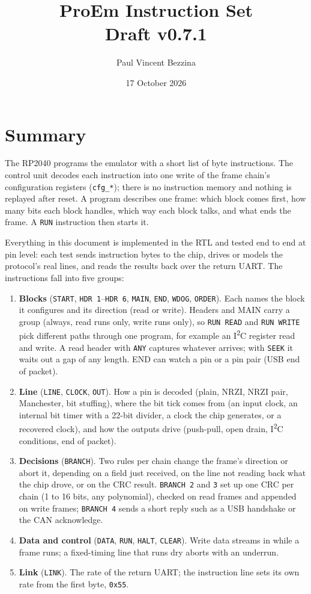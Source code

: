 \documentclass[11pt,a4paper]{article}
\title{ProEm Instruction Set\\\large Draft v0.7.1}
\author{Paul Vincent Bezzina}
\date{17 October 2026}
\newcommand{\sig}[1]{\texttt{#1}}
\begin{document}
\maketitle

\section{Summary}

The RP2040 programs the emulator with a short list of byte instructions. The control unit decodes each instruction into one write of the frame chain's configuration registers (\sig{cfg\_*}); there is no instruction memory and nothing is replayed after reset. A program describes one frame: which block comes first, how many bits each block handles, which way each block talks, and what ends the frame. A \sig{RUN} instruction then starts it.

Everything in this document is implemented in the RTL and tested end to end at pin level: each test sends instruction bytes to the chip, drives or models the protocol's real lines, and reads the results back over the return UART. The instructions fall into five groups:

\begin{enumerate}
\item \textbf{Blocks} (\sig{START}, \sig{HDR 1}--\sig{HDR 6}, \sig{MAIN}, \sig{END}, \sig{WDOG}, \sig{ORDER}). Each names the block it configures and its direction (read or write). Headers and MAIN carry a group (always, read runs only, write runs only), so \sig{RUN READ} and \sig{RUN WRITE} pick different paths through one program, for example an I\textsuperscript{2}C register read and write. A read header with \sig{ANY} captures whatever arrives; with \sig{SEEK} it waits out a gap of any length. END can watch a pin or a pin pair (USB end of packet).
\item \textbf{Line} (\sig{LINE}, \sig{CLOCK}, \sig{OUT}). How a pin is decoded (plain, NRZI, NRZI pair, Manchester, bit stuffing), where the bit tick comes from (an input clock, an internal bit timer with a 22-bit divider, a clock the chip generates, or a recovered clock), and how the outputs drive (push-pull, open drain, I\textsuperscript{2}C conditions, end of packet).
\item \textbf{Decisions} (\sig{BRANCH}). Two rules per chain change the frame's direction or abort it, depending on a field just received, on the line not reading back what the chip drove, or on the CRC result. \sig{BRANCH 2} and \sig{3} set up one CRC per chain (1 to 16 bits, any polynomial), checked on read frames and appended on write frames; \sig{BRANCH 4} sends a short reply such as a USB handshake or the CAN acknowledge.
\item \textbf{Data and control} (\sig{DATA}, \sig{RUN}, \sig{HALT}, \sig{CLEAR}). Write data streams in while a frame runs; a fixed-timing line that runs dry aborts with an underrun.
\item \textbf{Link} (\sig{LINK}). The rate of the return UART; the instruction line sets its own rate from the first byte, \texttt{0x55}.
\end{enumerate}
\end{document}

